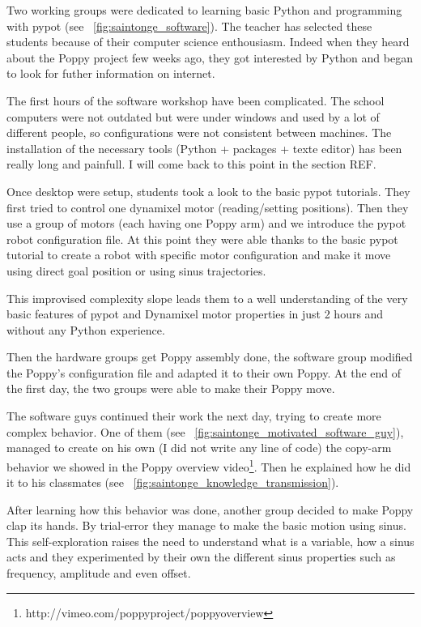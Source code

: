 Two working groups were dedicated to learning basic Python and programming with pypot (see \figurename~\ref{fig:saintonge_software}). The teacher has selected these students because of their computer science enthousiasm. Indeed when they heard about the Poppy project few weeks ago, they got interested by Python and began to look for futher information on internet.

The first hours of the software workshop have been complicated. The school computers were not outdated but were under windows and used by a lot of different people, so configurations were not consistent between machines. The installation of the necessary tools (Python + packages + texte editor) has been really long and painfull. I will come back to this point in the section REF.

Once desktop were setup, students took a look to the basic pypot tutorials. They first tried to control one dynamixel motor (reading/setting positions). Then they use a group of motors (each having one Poppy arm) and we introduce the pypot robot configuration file. At this point they were able thanks to the basic pypot tutorial to create a robot with specific motor configuration and make it move using direct goal position or using sinus trajectories.

This improvised complexity slope leads them to a well understanding of the very basic features of pypot and Dynamixel motor properties in just 2 hours and without any Python experience.

Then the hardware groups get Poppy assembly done, the software group modified the Poppy's configuration file and adapted it to their own Poppy. At the end of the first day, the two groups were able to make their Poppy move.

The software guys continued their work the next day, trying to create more complex behavior. One of them (see \figurename~\ref{fig:saintonge_motivated_software_guy}), managed to create on his own (I did not write any line of code) the copy-arm behavior we showed in the Poppy overview video\footnote{http://vimeo.com/poppyproject/poppyoverview}. Then he explained how he did it to his classmates (see \figurename~\ref{fig:saintonge_knowledge_transmission}).

After learning how this behavior was done, another group decided to make Poppy clap its hands. By trial-error they manage to make the basic motion using sinus. This self-exploration raises the need to understand what is a variable, how a sinus acts and they experimented by their own the different sinus properties such as frequency, amplitude and even offset.

